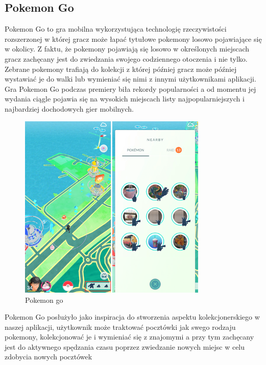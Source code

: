 \documentclass[a4paper,twoside,12pt]{book}
\begin{document}
\newpage
\subsection{Pokemon Go}
Pokemon Go to gra mobilna wykorzystująca technologię rzeczywistości rozszerzonej w której gracz może łapać tytułowe pokemony losowo pojawiające się w okolicy. Z faktu, że pokemony pojawiają się losowo w określonych miejscach gracz zachęcany jest do zwiedzania swojego codziennego otoczenia i nie tylko. Zebrane pokemony trafiają do kolekcji z której później gracz może później wystawiać je do walki lub wymieniać się nimi z innymi użytkownikami aplikacji. Gra Pokemon Go podczas premiery biła rekordy popularności a od momentu jej wydania ciągle pojawia się na wysokich miejscach listy najpopularniejszych i najbardziej dochodowych gier mobilnych.
\begin{figure}[H]
    \centering
    \includegraphics[width=0.8\textwidth]{apki_ss/pokemon.png}
    \caption{Pokemon go}
\end{figure}
Pokemon Go posłużyło jako inspiracja do stworzenia aspektu kolekcjonerskiego w naszej aplikacji, użytkownik może traktować pocztówki jak swego rodzaju pokemony, kolekcjonować je i wymieniać się z znajomymi a przy tym zachęcany jest do aktywnego spędzania czasu poprzez zwiedzanie nowych miejsc w celu zdobycia nowych pocztówek

\newpage
\end{document}
